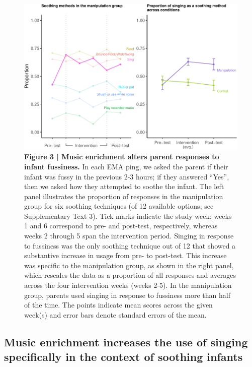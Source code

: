 \documentclass[
]{article}
\begin{document}
\begin{figure}[p]

{\centering \includegraphics{MIPH_childdev_files/figure-latex/figure-3AB-1} 

}

\caption{\textbf{Figure 3 | Music enrichment alters parent responses to infant fussiness.} In each EMA ping, we asked the parent if their infant was fussy in the previous 2-3 hours; if they answered ``Yes'', then we asked how they attempted to soothe the infant. The left panel illustrates the proportion of responses in the manipulation group for six soothing techniques (of 12 available options; see Supplementary Text 3). Tick marks indicate the study week; weeks 1 and 6 correspond to pre- and post-test, respectively, whereas weeks 2 through 5 span the intervention period. Singing in response to fussiness was the only soothing technique out of 12 that showed a substantive increase in usage from pre- to post-test. This increase was specific to the manipulation group, as shown in the right panel, which rescales the data as a proportion of all responses and averages across the four intervention weeks (weeks 2-5). In the manipulation group, parents used singing in response to fussiness more than half of the time. The points indicate mean scores across the given week(s) and error bars denote standard errors of the mean.}\label{fig:figure-3AB}
\end{figure}

\subsection{Music enrichment increases the use of singing specifically
in the context of soothing
infants}\label{music-enrichment-increases-the-use-of-singing-specifically-in-the-context-of-soothing-infants}
\end{document}

